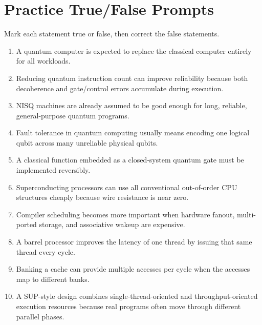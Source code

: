 \section{Practice True/False Prompts}\label{sec:appd-true-false}
Mark each statement true or false, then correct the false statements.
\begin{enumerate}
    \item A quantum computer is expected to replace the classical computer entirely for all workloads.
    \item Reducing quantum instruction count can improve reliability because both decoherence and gate/control errors accumulate during execution.
    \item NISQ machines are already assumed to be good enough for long, reliable, general-purpose quantum programs.
    \item Fault tolerance in quantum computing usually means encoding one logical qubit across many unreliable physical qubits.
    \item A classical function embedded as a closed-system quantum gate must be implemented reversibly.
    \item Superconducting processors can use all conventional out-of-order CPU structures cheaply because wire resistance is near zero.
    \item Compiler scheduling becomes more important when hardware fanout, multi-ported storage, and associative wakeup are expensive.
    \item A barrel processor improves the latency of one thread by issuing that same thread every cycle.
    \item Banking a cache can provide multiple accesses per cycle when the accesses map to different banks.
    \item A SUP-style design combines single-thread-oriented and throughput-oriented execution resources because real programs often move through different parallel phases.
\end{enumerate}
